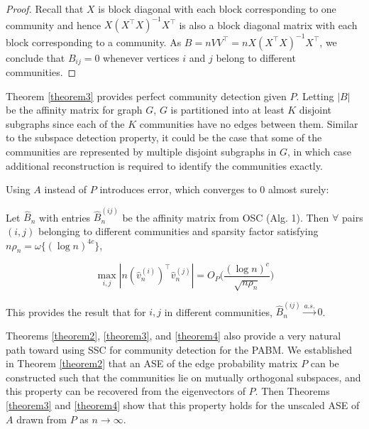 \documentclass[12pt]{article}
\begin{document}
\begin{proof}
Recall that \(X\) is block diagonal with each block
corresponding to one community and hence \(X (X^\top X)^{-1} X^\top\) is also a
block diagonal matrix with each block corresponding to a community. As $B = n VV^{\top} = n X (X^\top X)^{-1} X^\top$, we
conclude that $B_{ij} = 0$ whenever vertices $i$ and $j$ belong to different communities.  
\end{proof}


Theorem \ref{theorem3} provides perfect community detection given \(P\).
Letting \(|B|\) be the affinity matrix for graph \(G\), \(G\) is
partitioned into at least \(K\) disjoint subgraphs since each of the
\(K\) communities have no edges between them. Similar to the subspace
detection property, it could be the case that some of the communities
are represented by multiple disjoint subgraphs in \(G\), in which case
additional reconstruction is required to identify the communities
exactly.

Using \(A\) instead of \(P\) introduces error, which converges to \(0\)
almost surely:

\begin{theorem}
\label{theorem4}
Let $\hat{B}_n$ with entries $\hat{B}_n^{(ij)}$ be the affinity matrix from OSC
(Alg. 1). Then $\forall$ pairs $(i, j)$ belonging to different communities
and sparsity factor satisfying $n \rho_n = \omega\{(\log n)^{4c}\}$,

\begin{equation} \label{eq:thm4}
\max_{i, j} |n (\hat{v}_n^{(i)})^\top \hat{v}_n^{(j)}| =
O_P \Big( \frac{(\log n)^c}{\sqrt{n \rho_n}} \Big)
\end{equation}

This provides the result that for $i, j$ in different communities,
$\hat{B}_n^{(ij)} \stackrel{a.s.}{\to} 0$.
\end{theorem}

Theorems \ref{theorem2}, \ref{theorem3}, and \ref{theorem4} also provide
a very natural path toward using SSC for community detection for the
PABM. We established in Theorem \ref{theorem2} that an ASE of the edge
probability matrix \(P\) can be constructed such that the communities
lie on mutually orthogonal subspaces, and this property can be recovered
from the eigenvectors of \(P\). Then Theorems \ref{theorem3} and
\ref{theorem4} show that this property holds for the unscaled ASE of
\(A\) drawn from \(P\) as \(n \to \infty\).
\end{document}
